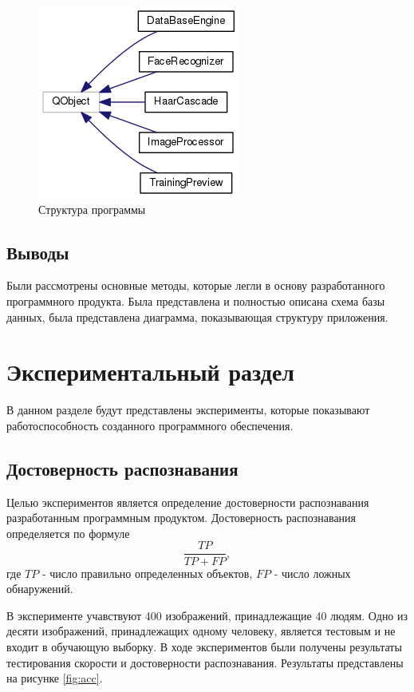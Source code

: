 \begin{figure}[h!]
  \centering
  \includegraphics{uml.png}
  \caption{Структура программы}
  \label{fig:proj-struct}
\end{figure}

\subsection*{Выводы}

Были рассмотрены основные методы, которые легли в основу разработанного
программного продукта. Была представлена и полностью описана схема базы данных,
была представлена диаграмма, показывающая структуру приложения.

\clearpage 
\section{Экспериментальный раздел}

В данном разделе будут представлены эксперименты, которые показывают
работоспособность созданного программного обеспечения.

\subsection{Достоверность распознавания}

Целью экспериментов является определение достоверности распознавания
разработанным программным продуктом. Достоверность распознавания определяется по
формуле
\[ \frac{TP}{TP+FP}, \]
где $TP$ - число правильно определенных объектов, $FP$ - число ложных обнаружений.


В эксперименте учавствуют 400 изображений, принадлежащие 40 людям.  Одно из
десяти изображений, принадлежащих одному человеку, является тестовым и не входит
в обучающую выборку.  В ходе экспериментов были получены результаты тестирования
скорости и достоверности распознавания. Результаты представлены на рисунке
\ref{fig:acc}.

